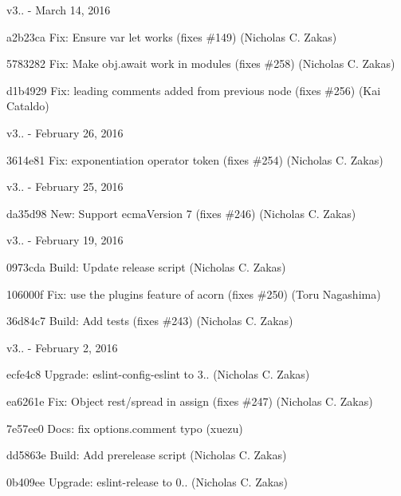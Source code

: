 v3.. -\/ March 14, 2016


\begin{DoxyItemize}
\item a2b23ca Fix\+: Ensure \textquotesingle{}var let\textquotesingle{} works (fixes \#149) (Nicholas C. Zakas)
\item 5783282 Fix\+: Make obj.\+await work in modules (fixes \#258) (Nicholas C. Zakas)
\item d1b4929 Fix\+: leading comments added from previous node (fixes \#256) (Kai Cataldo)
\end{DoxyItemize}

v3.. -\/ February 26, 2016


\begin{DoxyItemize}
\item 3614e81 Fix\+: exponentiation operator token (fixes \#254) (Nicholas C. Zakas)
\end{DoxyItemize}

v3.. -\/ February 25, 2016


\begin{DoxyItemize}
\item da35d98 New\+: Support ecma\+Version 7 (fixes \#246) (Nicholas C. Zakas)
\end{DoxyItemize}

v3.. -\/ February 19, 2016


\begin{DoxyItemize}
\item 0973cda Build\+: Update release script (Nicholas C. Zakas)
\item 106000f Fix\+: use the plugins feature of acorn (fixes \#250) (Toru Nagashima)
\item 36d84c7 Build\+: Add tests (fixes \#243) (Nicholas C. Zakas)
\end{DoxyItemize}

v3.. -\/ February 2, 2016


\begin{DoxyItemize}
\item ecfe4c8 Upgrade\+: eslint-\/config-\/eslint to 3.. (Nicholas C. Zakas)
\item ea6261e Fix\+: Object rest/spread in assign (fixes \#247) (Nicholas C. Zakas)
\item 7e57ee0 Docs\+: fix {\ttfamily options.\+comment} typo (xuezu)
\item dd5863e Build\+: Add prerelease script (Nicholas C. Zakas)
\item 0b409ee Upgrade\+: eslint-\/release to 0.. (Nicholas C. Zakas)
\end{DoxyItemize}

